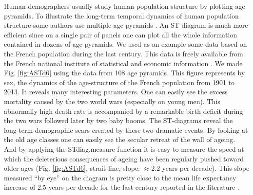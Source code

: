 Human demographers usually study human population structure by plotting age
pyramids. To illustrate the long-term temporal dynamics of human population
structure some authors use multiple age pyramids \autocites{vallin1999a}.
An ST-diagram is much more efficient since on a single pair of panels one can plot
all the whole information contained in dozens of age pyramids. We used as an
example some data based on the French population during the last century. This
data is freely available from the French national institute of statistical and
economic information \autocites{insee2010a}. We made Fig. \ref{fig:ASTd6} using
the data from 108 age pyramids. This figure represents by sex, the dynamics of the age-structure of
the French population from 1901 to 2013. It reveals many interesting parameters.
One can easily see the excess mortality caused by the two world wars (especially
on young men). This abnormally high death rate is accompanied by a remarkable
birth deficit during the two wars followed later by two baby booms. The
ST-diagrams reveal the long-term demographic scars created by these two dramatic
events. By looking at the old age classes one can easily see the secular retreat
of the wall of ageing. And by applying the STdiag.measure function it is easy to
measure the speed at which the deleterious consequences of ageing have been
regularly pushed toward older ages (Fig. \ref{fig:ASTd6}, strait line, slope:
$\approx 2.2$ years per decade). This slope measured “by eye” on the diagram is
pretty close to the mean life expectancy increase of 2.5 years per decade for the last century reported
in the literature \autocites{oeppen2002a}.

